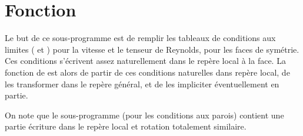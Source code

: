 %
%
%
%
%
%
%
%


\vspace{1cm}
\section{Fonction}
Le but de ce sous-programme est de remplir les tableaux de conditions aux
limites ( et ) pour la vitesse et le tenseur de Reynolds,
pour les faces de sym\'etrie. Ces conditions s'\'ecrivent assez
naturellement dans le rep\`ere local \`a la face. La fonction de 
est alors de partir de ces conditions naturelles dans rep\`ere local, de les
transformer dans le rep\`ere g\'en\'eral, et de les impliciter \'eventuellement
en partie.

On note que le sous-programme  (pour les conditions aux parois)
contient une partie \'ecriture dans
le rep\`ere local et rotation totalement similaire.


